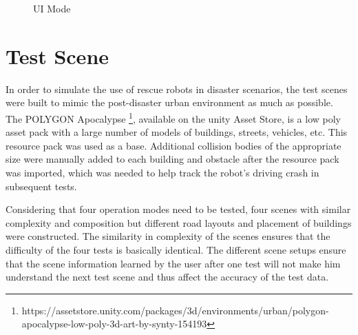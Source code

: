\begin{figure}[htbp]
    \centering
    \caption{UI Mode}
    \label{fig:ui} 
\end{figure}


\section{Test Scene}
In order to simulate the use of rescue robots in disaster scenarios, the test scenes were built to mimic the post-disaster urban environment as much as possible. The POLYGON Apocalypse \footnote{https://assetstore.unity.com/packages/3d/environments/urban/polygon-apocalypse-low-poly-3d-art-by-synty-154193}, available on the \gls{unity} Asset Store, is a low poly asset pack with a large number of models of buildings, streets, vehicles, etc. This resource pack was used as a base. Additional collision bodies of the appropriate size were manually added to each building and obstacle after the resource pack was imported, which was needed to help track the robot's driving crash in subsequent tests.

Considering that four operation modes need to be tested, four scenes with similar complexity and composition but different road layouts and placement of buildings were constructed. The similarity in complexity of the scenes ensures that the difficulty of the four tests is basically identical. The different scene setups ensure that the scene information learned by the user after one test will not make him understand the next test scene and thus affect the accuracy of the test data. 

